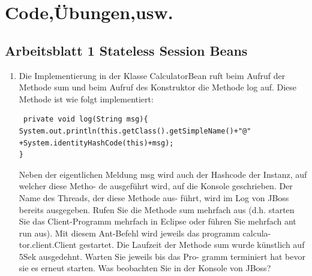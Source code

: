 \documentclass[a4paper,10pt]{scrreprt}
\begin{document}
\part{Code,Übungen,usw.}
\chapter{Arbeitsblatt 1 Stateless Session Beans}

\begin{enumerate}
 \item Die Implementierung in der Klasse CalculatorBean ruft beim Aufruf der Methode sum und beim
Aufruf des Konstruktor die Methode log auf. Diese Methode ist wie folgt implementiert:
\begin{verbatim}
 private void log(String msg){
System.out.println(this.getClass().getSimpleName()+"@"
+System.identityHashCode(this)+msg);
}
\end{verbatim}
Neben der eigentlichen Meldung msg wird auch der Hashcode der Instanz, auf welcher diese Metho-
de ausgeführt wird, auf die Konsole geschrieben. Der Name des Threads, der diese Methode aus-
führt, wird im Log von JBoss bereits ausgegeben.
Rufen Sie die Methode sum mehrfach aus (d.h. starten Sie das Client-Programm mehrfach in Eclipse
oder führen Sie mehrfach ant run aus). Mit diesem Ant-Befehl wird jeweils das programm calcula-
tor.client.Client gestartet.
Die Laufzeit der Methode sum wurde künstlich auf 5Sek ausgedehnt. Warten Sie jeweils bis das Pro-
gramm terminiert hat bevor sie es erneut starten.
Was beobachten Sie in der Konsole von JBoss? 


\end{enumerate}
\end{document}
